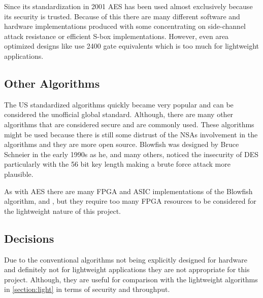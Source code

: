 \documentclass[12pt,twoside,a4paper]{report}
\begin{document}
    
    Since its standardization in 2001 AES has been used almost exclusively because its security is trusted. Because of this there are many different software and hardware implementations produced with some concentrating on side-channel attack resistance\cite{Strachacki2008} or efficient S-box implementations\cite{Gomes2016}. However, even area optimized designs like \cite{Moradi2011} use 2400 gate equivalents which is too much for lightweight applications.
        
    \subsection{Other Algorithms}
    The US standardized algorithms quickly became very popular and can be considered the unofficial global standard.
    Although, there are many other algorithms that are considered secure and are commonly used.
    These algorithms might be used because there is still some distrust of the NSAs involvement in the algorithms and they are more open source.
    Blowfish was designed by Bruce Schneier in the early 1990s as he, and many others, noticed the insecurity of DES particularly with the 56 bit key length making a brute force attack more plausible\cite{BruceSchneier1994}.
    
    As with AES there are many FPGA and ASIC implementations of the Blowfish algorithm, \cite{Chatterjee2014} and \cite{Prasetyo2014}, but they require too many FPGA resources to be considered for the lightweight nature of this project.
    
    \subsection{Decisions}
    Due to the conventional algorithms not being explicitly designed for hardware and definitely not for lightweight applications they are not appropriate for this project. Although, they are useful for comparison with the lightweight algorithms in \autoref{section:light} in terms of security and throughput.
    
\end{document}
